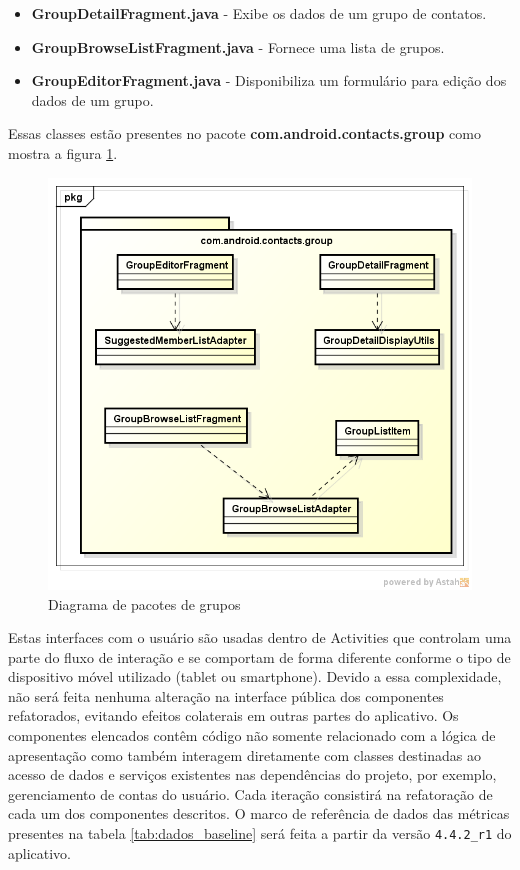 \documentclass[conference]{IEEEtran}
\begin{document}
\begin{itemize}
\item \textbf{GroupDetailFragment.java} -  Exibe os dados de um grupo de
contatos.
\item \textbf{GroupBrowseListFragment.java} - Fornece uma lista de grupos.
\item \textbf{GroupEditorFragment.java} - Disponibiliza um formulário para
edição dos dados de um grupo.
\end{itemize}

Essas classes estão presentes no pacote \textbf{com.android.contacts.group} como
mostra a figura \ref{fig:classes_group_baseline}.

\begin{figure}[htb]
	\begin{center}
		\includegraphics[scale=0.3]{img/classes_group_baseline.png}
	\end{center}
	\caption{\label{fig:classes_group_baseline} Diagrama de pacotes de grupos}   
\end{figure}

Estas interfaces com o usuário são usadas dentro de Activities que controlam uma
parte do fluxo de interação e se comportam de forma diferente conforme o tipo de dispositivo
móvel utilizado (tablet ou smartphone). Devido a essa complexidade, não será
feita nenhuma alteração na interface pública dos componentes refatorados, evitando efeitos colaterais em
outras partes do aplicativo. Os componentes elencados contêm código não somente
relacionado com a lógica de apresentação como também interagem diretamente com classes destinadas ao acesso
de dados e serviços existentes nas dependências do projeto, por exemplo,
gerenciamento de contas do usuário.  Cada iteração consistirá na refatoração de
cada um dos componentes descritos. O marco de referência de dados das métricas presentes na tabela \ref{tab:dados_baseline} será feita a partir da
versão \verb|4.4.2_r1| do aplicativo.
\end{document}
